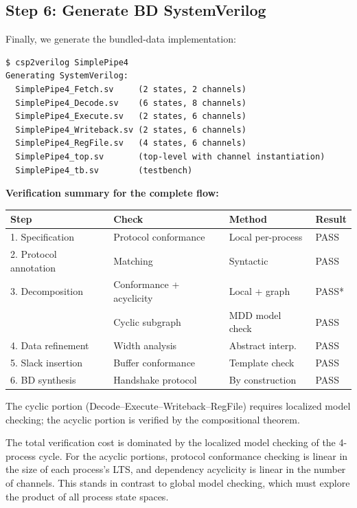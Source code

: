 \documentclass[11pt]{article}
\begin{document}
\subsection{Step 6: Generate BD SystemVerilog}

Finally, we generate the bundled-data implementation:

\begin{Verbatim}[samepage=true]
$ csp2verilog SimplePipe4
Generating SystemVerilog:
  SimplePipe4_Fetch.sv     (2 states, 2 channels)
  SimplePipe4_Decode.sv    (6 states, 8 channels)
  SimplePipe4_Execute.sv   (2 states, 6 channels)
  SimplePipe4_Writeback.sv (2 states, 6 channels)
  SimplePipe4_RegFile.sv   (4 states, 6 channels)
  SimplePipe4_top.sv       (top-level with channel instantiation)
  SimplePipe4_tb.sv        (testbench)
\end{Verbatim}

\textbf{Verification summary for the complete flow:}

\begin{center}
\begin{tabular}{llll}
\toprule
\textbf{Step} & \textbf{Check} & \textbf{Method} & \textbf{Result} \\
\midrule
1. Specification & Protocol conformance & Local per-process & PASS \\
2. Protocol annotation & Matching & Syntactic & PASS \\
3. Decomposition & Conformance + acyclicity & Local + graph & PASS* \\
  & Cyclic subgraph & MDD model check & PASS \\
4. Data refinement & Width analysis & Abstract interp. & PASS \\
5. Slack insertion & Buffer conformance & Template check & PASS \\
6. BD synthesis & Handshake protocol & By construction & PASS \\
\bottomrule
\end{tabular}
\end{center}

\noindent *The cyclic portion (Decode--Execute--Writeback--RegFile)
requires localized model checking; the acyclic portion is verified by
the compositional theorem.

The total verification cost is dominated by the localized model
checking of the 4-process cycle.  For the acyclic portions, protocol
conformance checking is linear in the size of each process's LTS,
and dependency acyclicity is linear in the number of channels.  This
stands in contrast to global model checking, which must explore the
product of all process state spaces.
\end{document}
